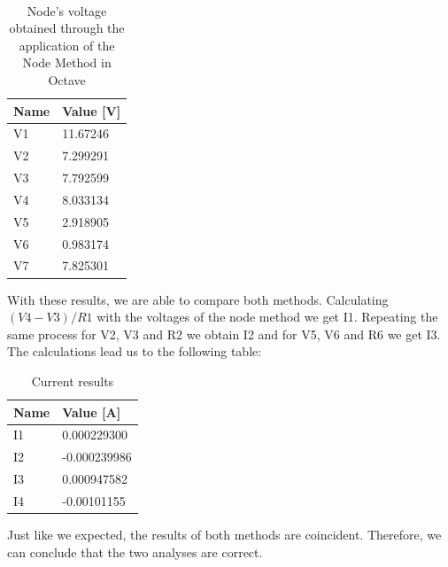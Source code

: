 \documentclass[11en, a4paper, oneside]{article}
\begin{document}
\paragraph{}
\begin{table}[ht]
\begin{center}
\begin{tabular}{|l|l|}
\hline
\textbf{Name} & \textbf{Value {[}V{]}} \\ \hline
V1            & 11.67246               \\ \hline
V2            & 7.299291                \\ \hline
V3            & 7.792599               \\ \hline
V4            & 8.033134               \\ \hline
V5            & 2.918905              \\ \hline
V6            & 0.983174              \\ \hline
V7            & 7.825301              \\ \hline
\end{tabular}
\caption{Node's voltage obtained through the application of the Node Method in Octave}
\end{center}
\end{table}

\par With these results, we are able to compare both methods. Calculating $(V4-V3)/R1$ with the voltages of the node method we get I1. Repeating the same process for V2, V3 and R2 we obtain I2 and for V5, V6 and R6 we get I3. The calculations lead us to the following table:

\begin{table}[ht]
\begin{center}
    \begin{tabular}{|l|l|}
\hline
\textbf{Name} & \textbf{Value {[}A{]}} \\ \hline
I1            & 0.000229300            \\ \hline
I2            & -0.000239986           \\ \hline
I3            & 0.000947582             \\ \hline
I4            & -0.00101155            \\ \hline
\end{tabular}
\caption{Current results}
\end{center}
\end{table}

Just like we expected, the results of both methods are coincident. Therefore, we can conclude that the two analyses are correct.
\end{document}
